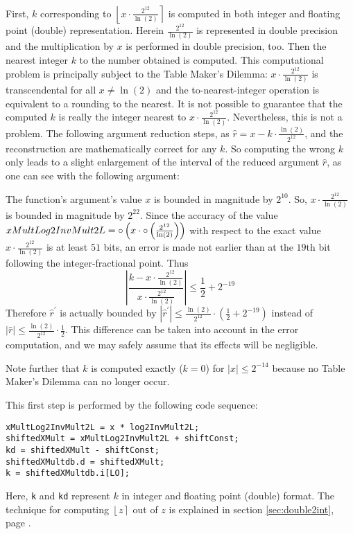 First, $k$ corresponding to $\left \lfloor x \cdot
\frac{2^{12}}{\ln\left(2 \right)} \right \rceil$ is computed in both
integer and floating point (double) representation. Herein
$\frac{2^{12}}{\ln\left(2 \right)}$ is represented in double precision
and the multiplication by $x$ is performed in double precision,
too. Then the nearest integer $k$ to the number obtained is
computed. This computational problem is principally subject to the
Table Maker's Dilemma: $x \cdot \frac{2^{12}}{\ln\left(2 \right)}$ is
transcendental for all $x \not = \ln\left(2 \right)$ and the
to-nearest-integer operation is equivalent to a rounding to the
nearest. It is not possible to guarantee that the computed $k$ is
really the integer nearest to $x \cdot \frac{2^{12}}{\ln\left(2
\right)}$. Nevertheless, this is not a problem. The following argument
reduction steps, as $\hat{r} = x - k \cdot
\frac{\ln\left(2\right)}{2^{12}}$, and the reconstruction are
mathematically correct for any $k$. So computing the wrong $k$ only
leads to a slight enlargement of the interval of the reduced argument
$\hat{r}$, as one can see with the following argument:

The function's argument's value $x$ is bounded in magnitude by
$2^{10}$. So, $x \cdot \frac{2^{12}}{\ln\left(2 \right)}$ is bounded
in magnitude by $2^{22}$. Since the accuracy of the value
$xMultLog2InvMult2L = \circ \left( x \cdot \circ \left(
\frac{2^{12}}{\ln\left(2 \right)} \right) \right)$ with respect to the
exact value $x \cdot \frac{2^{12}}{\ln\left(2 \right)}$ is at least
$51$ bits, an error is made not earlier than at the $19$th bit
following the integer-fractional point. Thus
$$\left \vert \frac{k - x \cdot \frac{2^{12}}{\ln\left(2
      \right)}}{x \cdot \frac{2^{12}}{\ln\left(2 \right)}} \right
\vert \leq \frac{1}{2} + 2^{-19}$$ Therefore $\hat{r}^\prime$ is
actually bounded by $\left \vert \hat{r}^\prime \right \vert \leq
\frac{\ln\left( 2 \right)}{2^{12}} \cdot \left( \frac{1}{2} + 2^{-19}
\right)$ instead of $\left \vert \hat{r} \right \vert \leq
\frac{\ln\left( 2 \right)}{2^{12}} \cdot \frac{1}{2}$. This difference
can be taken into account in the error computation, and we may safely
assume that its effects will be negligible.

Note further that $k$ is computed exactly ($k = 0$) for $\left \vert x
\right \vert \leq 2^{-14}$ because no Table Maker's Dilemma can no
longer occur.

This first step is performed by the following code sequence:
\begin{lstlisting}[caption={Argument reduction - first step},firstnumber=1]
xMultLog2InvMult2L = x * log2InvMult2L;
shiftedXMult = xMultLog2InvMult2L + shiftConst;
kd = shiftedXMult - shiftConst;
shiftedXMultdb.d = shiftedXMult;
k = shiftedXMultdb.i[LO];
\end{lstlisting}
Here, \texttt{k} and \texttt{kd} represent $k$ in integer and floating
point (double) format. The technique for computing $\left \lfloor z
\right \rceil$ out of $z$ is explained in section
\ref{sec:double2int}, page \pageref{sec:double2int}.

